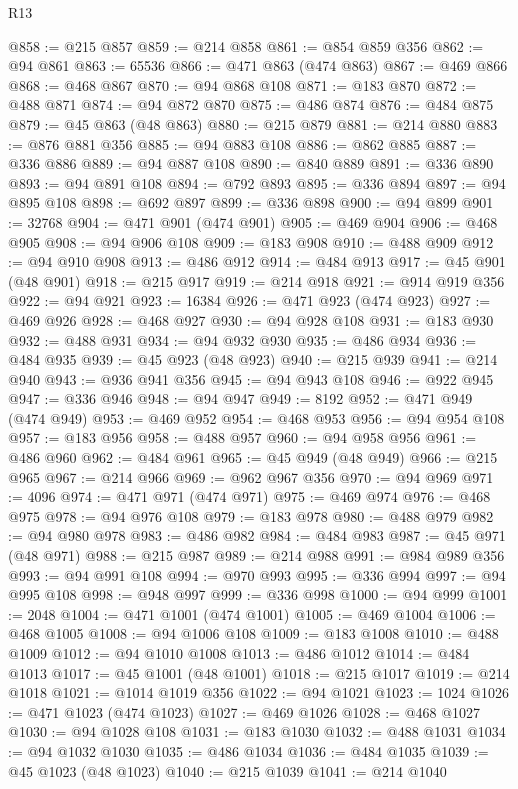 \begin{lexlean}{R13}
\begin{coremodule}
@858 := @215 @857
@859 := @214 @858
@861 := @854 @859 @356
@862 := @94 @861
@863 := 65536
@866 := @471 @863 (@474 @863)
@867 := @469 @866
@868 := @468 @867
@870 := @94 @868 @108
@871 := @183 @870
@872 := @488 @871
@874 := @94 @872 @870
@875 := @486 @874
@876 := @484 @875
@879 := @45 @863 (@48 @863)
@880 := @215 @879
@881 := @214 @880
@883 := @876 @881 @356
@885 := @94 @883 @108
@886 := @862 @885
@887 := @336 @886
@889 := @94 @887 @108
@890 := @840 @889
@891 := @336 @890
@893 := @94 @891 @108
@894 := @792 @893
@895 := @336 @894
@897 := @94 @895 @108
@898 := @692 @897
@899 := @336 @898
@900 := @94 @899
@901 := 32768
@904 := @471 @901 (@474 @901)
@905 := @469 @904
@906 := @468 @905
@908 := @94 @906 @108
@909 := @183 @908
@910 := @488 @909
@912 := @94 @910 @908
@913 := @486 @912
@914 := @484 @913
@917 := @45 @901 (@48 @901)
@918 := @215 @917
@919 := @214 @918
@921 := @914 @919 @356
@922 := @94 @921
@923 := 16384
@926 := @471 @923 (@474 @923)
@927 := @469 @926
@928 := @468 @927
@930 := @94 @928 @108
@931 := @183 @930
@932 := @488 @931
@934 := @94 @932 @930
@935 := @486 @934
@936 := @484 @935
@939 := @45 @923 (@48 @923)
@940 := @215 @939
@941 := @214 @940
@943 := @936 @941 @356
@945 := @94 @943 @108
@946 := @922 @945
@947 := @336 @946
@948 := @94 @947
@949 := 8192
@952 := @471 @949 (@474 @949)
@953 := @469 @952
@954 := @468 @953
@956 := @94 @954 @108
@957 := @183 @956
@958 := @488 @957
@960 := @94 @958 @956
@961 := @486 @960
@962 := @484 @961
@965 := @45 @949 (@48 @949)
@966 := @215 @965
@967 := @214 @966
@969 := @962 @967 @356
@970 := @94 @969
@971 := 4096
@974 := @471 @971 (@474 @971)
@975 := @469 @974
@976 := @468 @975
@978 := @94 @976 @108
@979 := @183 @978
@980 := @488 @979
@982 := @94 @980 @978
@983 := @486 @982
@984 := @484 @983
@987 := @45 @971 (@48 @971)
@988 := @215 @987
@989 := @214 @988
@991 := @984 @989 @356
@993 := @94 @991 @108
@994 := @970 @993
@995 := @336 @994
@997 := @94 @995 @108
@998 := @948 @997
@999 := @336 @998
@1000 := @94 @999
@1001 := 2048
@1004 := @471 @1001 (@474 @1001)
@1005 := @469 @1004
@1006 := @468 @1005
@1008 := @94 @1006 @108
@1009 := @183 @1008
@1010 := @488 @1009
@1012 := @94 @1010 @1008
@1013 := @486 @1012
@1014 := @484 @1013
@1017 := @45 @1001 (@48 @1001)
@1018 := @215 @1017
@1019 := @214 @1018
@1021 := @1014 @1019 @356
@1022 := @94 @1021
@1023 := 1024
@1026 := @471 @1023 (@474 @1023)
@1027 := @469 @1026
@1028 := @468 @1027
@1030 := @94 @1028 @108
@1031 := @183 @1030
@1032 := @488 @1031
@1034 := @94 @1032 @1030
@1035 := @486 @1034
@1036 := @484 @1035
@1039 := @45 @1023 (@48 @1023)
@1040 := @215 @1039
@1041 := @214 @1040

\end{coremodule}
\end{lexlean}
